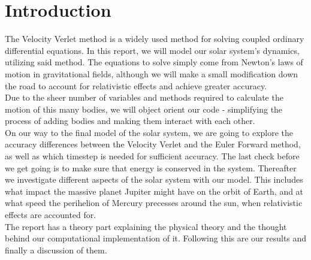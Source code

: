 \documentclass[../main.tex]{subfiles}
\begin{document}
\section{Introduction}\label{introduction}
The Velocity Verlet method is a widely used method for solving coupled ordinary differential equations. In this report, we will model our solar system's dynamics, utilizing said method. The equations to solve simply come from Newton's laws of motion in gravitational fields, although we will make a small modification down the road to account for relativistic effects and achieve greater accuracy.\\
Due to the sheer number of variables and methods required to calculate the motion of this many bodies, we will object orient our code - simplifying the process of adding bodies and making them interact with each other. \\
On our way to the final model of the solar system, we are going to explore the accuracy differences between the Velocity Verlet and the Euler Forward method, as well as which timestep is needed for sufficient accuracy. The last check before we get going is to make sure that energy is conserved in the system. Thereafter we investigate different aspects of the solar system with our model. This includes what impact the massive planet Jupiter might have on the orbit of Earth, and at what speed the perihelion of Mercury precesses around the sun, when relativistic effects are accounted for. \\
The report has a theory part explaining the physical theory and the thought behind our computational implementation of it. Following this are our results and finally a discussion of them.
\end{document}
